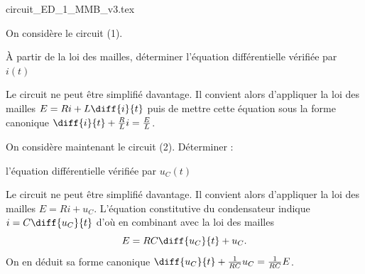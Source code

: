 \begin{center}
{circuit_ED_1_MMB_v3.tex}
\end{center}

\debutEntrainement

On considère le circuit (1). 


\begin{enonce}
À partir de la loi des mailles, 
déterminer l'équation différentielle vérifiée par $i(t)$  
 
\end{enonce}


\begin{corrige}
Le circuit ne peut être simplifié davantage. Il convient alors d'appliquer la loi des mailles $E= Ri + L \diff{i}{t}$ puis de mettre cette équation sous la forme canonique $\diff{i}{t} + \frac{R}{L} i  = \frac{E}{L}$.
\end{corrige}


\bigskip
On considère maintenant le circuit (2). Déterminer : \minusMedskip


\begin{enonce}
l'équation différentielle vérifiée par $u_C(t)$
\end{enonce}


\begin{corrige}
Le circuit ne peut être simplifié davantage. Il convient alors d'appliquer la loi des mailles $E= Ri + u_C$. L'équation constitutive du condensateur indique $i = C \diff{u_C}{t}$ d'où en combinant avec la loi des mailles 
\[
E = RC \diff{u_C}{t} + u_C.
\]
On en déduit sa forme canonique $\diff{u_C}{t} + \frac{1}{RC} u_C = \frac{1}{RC}E$.
\end{corrige}



